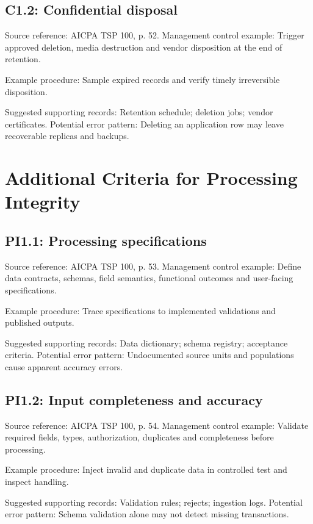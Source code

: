 \documentclass[10pt,oneside]{report}
\begin{document}
\subsection*{C1.2: Confidential disposal}
Source reference: AICPA TSP 100, p. 52. Management control example: Trigger approved deletion, media destruction and vendor disposition at the end of retention.

Example procedure: Sample expired records and verify timely irreversible disposition.

Suggested supporting records: Retention schedule; deletion jobs; vendor certificates. Potential error pattern: Deleting an application row may leave recoverable replicas and backups.

\section{Additional Criteria for Processing Integrity}
\subsection*{PI1.1: Processing specifications}
Source reference: AICPA TSP 100, p. 53. Management control example: Define data contracts, schemas, field semantics, functional outcomes and user-facing specifications.

Example procedure: Trace specifications to implemented validations and published outputs.

Suggested supporting records: Data dictionary; schema registry; acceptance criteria. Potential error pattern: Undocumented source units and populations cause apparent accuracy errors.

\subsection*{PI1.2: Input completeness and accuracy}
Source reference: AICPA TSP 100, p. 54. Management control example: Validate required fields, types, authorization, duplicates and completeness before processing.

Example procedure: Inject invalid and duplicate data in controlled test and inspect handling.

Suggested supporting records: Validation rules; rejects; ingestion logs. Potential error pattern: Schema validation alone may not detect missing transactions.

\end{document}
